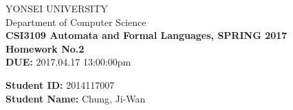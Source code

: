 \documentclass[paper=a4, fontsize=11pt]{scrartcl}
\begin{document}
\begin{center}
YONSEI UNIVERSITY\\
Department of Computer Science\\[0.1in]
{\textbf {CSI3109 Automata and Formal Languages, SPRING 2017}} \\[0.1in]
{\large{\textbf{Homework No.2}}}\\[0.1in]
{\textbf{DUE:}} 2017.04.17 13:00:00pm
\end{center}


\vspace{0.1in}
\noindent
{\textbf{Student ID:}} 2014117007 \\[0.15in]
{\textbf{Student Name:}} Chung, Ji-Wan
\vspace{0.3in}

\end{document}
